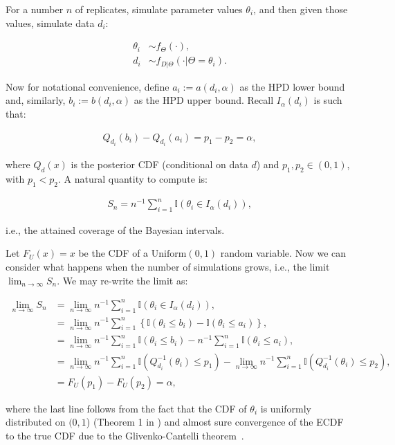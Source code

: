 \documentclass[oneside]{article}
\begin{document}
For a number $n$ of replicates, simulate parameter
  values $\theta_i$, and then given those values, simulate data $d_i$:

\begin{align*}
\theta_i & \sim f_\Theta(\cdot), \\
d_i & \sim f_{D|\Theta}(\cdot | \Theta=\theta_i).
\end{align*}

Now for notational convenience, define $a_i := a(d_i, \alpha)$ as the HPD lower bound and, similarly, $b_i := b(d_i, \alpha)$ as the HPD upper bound.
Recall $I_{\alpha}\left(d_i\right)$ is such that:


\begin{align*}
Q_{d_i}\left(b_i\right) - Q_{d_i}\left(a_i\right) = p_1 - p_2 = \alpha,
\end{align*}

\noindent where $Q_{d}(x)$ is the posterior CDF (conditional on data $d$) and $p_1, p_2 \in (0,1)$, with $p_1 < p_2$.
A natural quantity to compute is:

\begin{align*}
S_n = n^{-1}\sum_{i=1}^n \mathbb{I}\left(\theta_i \in I_{\alpha}\left(d_i\right) \right),
\end{align*}

\noindent i.e., the attained coverage of the Bayesian intervals.

Let $F_U(x) = x$ be the CDF of a $\operatorname{Uniform(0, 1)}$ random variable. 
Now we can consider what happens when the number of simulations grows, i.e., the limit $\lim_{n \to \infty} S_n$.
We may re-write the limit as:

\begin{align*}
\lim_{n \to \infty} S_n &= \lim_{n \to \infty} n^{-1}\sum_{i=1}^n \mathbb{I}\left(\theta_i \in I_{\alpha}\left(d_i\right) \right),\\
&=  \lim_{n \to \infty} n^{-1}\sum_{i=1}^n \left\{ \mathbb{I}\left(\theta_i \leq b_i \right) - \mathbb{I}\left(\theta_i \leq a_i \right) \right\},\\
&=  \lim_{n \to \infty} n^{-1}\sum_{i=1}^n \mathbb{I}\left(\theta_i \leq b_i \right) -  n^{-1}\sum_{i=1}^n\mathbb{I}\left(\theta_i \leq a_i \right),\\
&=  \lim_{n \to \infty} n^{-1}\sum_{i=1}^n \mathbb{I}\left(Q_{d_i}^{-1}\left(\theta_i\right) \leq p_1 \right) -   \lim_{n \to \infty} n^{-1}\sum_{i=1}^n\mathbb{I}\left(Q_{d_i}^{-1}\left(\theta_i\right) \leq p_2 \right),\\
&= F_U(p_1) - F_U(p_2) = \alpha,
\end{align*}

\noindent where the last line follows from the fact that the CDF of $\theta_i$ is uniformly distributed on $(0, 1$) (Theorem 1 in \citealp{Cook2006}) and almost sure convergence of the ECDF to the true CDF due to the  Glivenko-Cantelli theorem~\cite[page 275]{Billingsley1986}.

\end{document}
